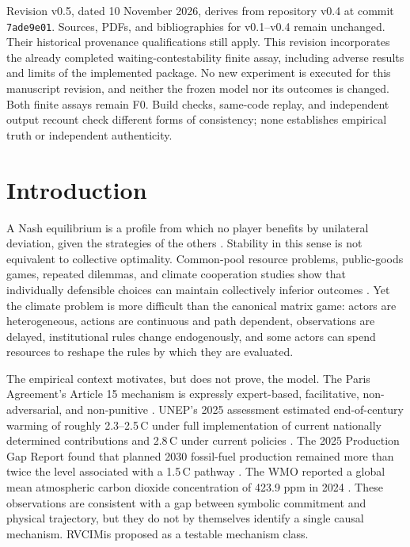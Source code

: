 \documentclass[11pt,a4paper]{article}
\numberwithin{equation}{section}
\theoremstyle{definition}
\theoremstyle{plain}
\theoremstyle{remark}
\newcommand{\RVCIM}{\textsc{RVCIM}}
\begin{document}
\begin{provenancebox}
Revision v0.5, dated 10 November 2026, derives from repository v0.4 at commit \texttt{7ade9e01}. Sources, PDFs, and bibliographies for v0.1--v0.4 remain unchanged. Their historical provenance qualifications still apply. This revision incorporates the already completed waiting-contestability finite assay, including adverse results and limits of the implemented package. No new experiment is executed for this manuscript revision, and neither the frozen model nor its outcomes is changed. Both finite assays remain F0. Build checks, same-code replay, and independent output recount check different forms of consistency; none establishes empirical truth or independent authenticity.
\end{provenancebox}

{\small\tableofcontents}
\newpage

\section{Introduction}

A Nash equilibrium is a profile from which no player benefits by unilateral deviation, given the strategies of the others \citep{nash1950}. Stability in this sense is not equivalent to collective optimality. Common-pool resource problems, public-goods games, repeated dilemmas, and climate cooperation studies show that individually defensible choices can maintain collectively inferior outcomes \citep{hardin1968,axelrod1984,ostrom1990,milinski2008,nordhaus2015}. Yet the climate problem is more difficult than the canonical matrix game: actors are heterogeneous, actions are continuous and path dependent, observations are delayed, institutional rules change endogenously, and some actors can spend resources to reshape the rules by which they are evaluated.

The empirical context motivates, but does not prove, the model. The Paris Agreement's Article 15 mechanism is expressly expert-based, facilitative, non-adversarial, and non-punitive \citep{unfccc2015,unfcccpaicc}. UNEP's 2025 assessment estimated end-of-century warming of roughly 2.3--2.5\,\textdegree C under full implementation of current nationally determined contributions and 2.8\,\textdegree C under current policies \citep{unep2025}. The 2025 Production Gap Report found that planned 2030 fossil-fuel production remained more than twice the level associated with a 1.5\,\textdegree C pathway \citep{productiongap2025}. The WMO reported a global mean atmospheric carbon dioxide concentration of 423.9 ppm in 2024 \citep{wmo2025}. These observations are consistent with a gap between symbolic commitment and physical trajectory, but they do not by themselves identify a single causal mechanism. \RVCIM is proposed as a testable mechanism class.
\end{document}
